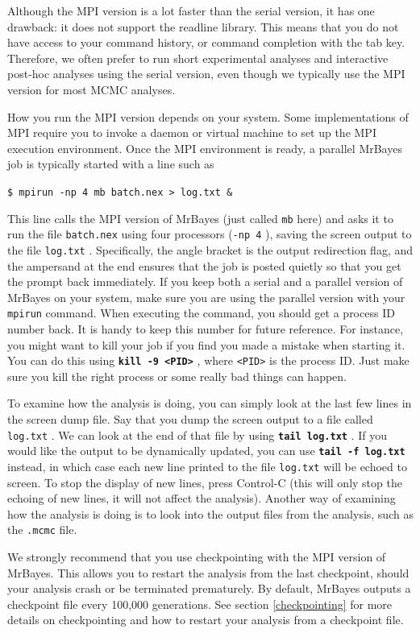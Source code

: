 \documentclass[12pt]{book}
\newcommand{\ttt}[1]{\texttt{#1} }
\newcommand{\tb}[1]{\ttt{\textbf{#1}} }
\begin{document}
Although the MPI version is a lot faster than the serial version, it has one drawback: it does not
support the readline library. This means that you do not have access to your command history, or
command completion with the tab key.  Therefore, we often prefer to run short experimental analyses
and interactive post-hoc analyses using the serial version, even though we typically use the MPI
version for most MCMC analyses.

How you run the MPI version depends on your system. Some implementations of MPI require you to
invoke a daemon or virtual machine to set up the MPI execution environment. Once the MPI
environment is ready, a parallel MrBayes job is typically started with a line such as

\ttt{\$ mpirun -np 4 mb batch.nex > log.txt \&}

This line calls the MPI version of MrBayes (just called \ttt{mb} here) and asks it to run the file
\ttt{batch.nex} using four processors (\ttt{-np 4}), saving the screen output to the file
\ttt{log.txt}. Specifically, the angle bracket is the output redirection flag, and the ampersand at
the end ensures that the job is posted quietly so that you get the prompt back immediately. If you
keep both a serial and a parallel version of MrBayes on your system, make sure you are using the
parallel version with your \ttt{mpirun} command.  When executing the command, you should get a
process ID number back. It is handy to keep this number for future reference. For instance, you
might want to kill your job if you find you made a mistake when starting it. You can do this using
\tb{kill -9 <PID>}, where \ttt{<PID>} is the process ID. Just make sure you kill the right process
or some really bad things can happen.

To examine how the analysis is doing, you can simply look at the last few lines in the screen dump
file.  Say that you dump the screen output to a file called \ttt{log.txt}. We can look at the end
of that file by using \tb{tail log.txt}. If you would like the output to be dynamically updated,
you can use \tb{tail -f log.txt} instead, in which case each new line printed to the file
\ttt{log.txt} will be echoed to screen. To stop the display of new lines, press Control-C (this
will only stop the echoing of new lines, it will not affect the analysis). Another way of examining
how the analysis is doing is to look into the output files from the analysis, such as the
\ttt{.mcmc} file.

We strongly recommend that you use checkpointing with the MPI version of MrBayes. This allows you
to restart the analysis from the last checkpoint, should your analysis crash or be terminated
prematurely.  By default, MrBayes outputs a checkpoint file every 100,000 generations. See section
\ref{checkpointing} for more details on checkpointing and how to restart your analysis from a
checkpoint file.
\end{document}
